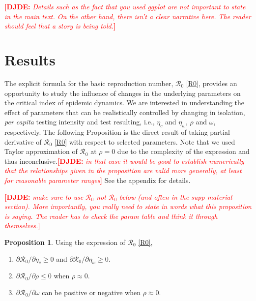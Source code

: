 \documentclass[12pt]{article}
\newcommand{\percap}{\emph{per capita}\xspace}
\newcommand{\Rnum}{\mathcal{R}_0}
\newcommand{\comment}{\showcomment}
\newcommand{\showcomment}[3]{\textcolor{#1}{\textbf{[#2: }\textsl{#3}\textbf{]}}}
\newcommand{\david}[1]{\comment{red}{DJDE}{#1}}
\theoremstyle{definition} %
\newtheorem{proposition}{Proposition}
\begin{document}
\david{Details such as the fact that you used ggplot are not important to state in the main text.  On the other hand, there isn't a clear narrative here.  The reader should feel that a story is being told.}

\section{Results}

The explicit formula for the basic reproduction number, $\Rnum$ \eqref{R0}, provides an opportunity to study the influence of changes in the underlying parameters on the critical index of epidemic dynamics. We are interested in understanding the effect of parameters that can be realistically controlled by changing in isolation, \percap testing intensity and test resulting, i.e., $\eta_c$ and $\eta_w$, $\rho$ and $\omega$, respectively. The following Proposition is the direct result of taking partial derivative of $\Rnum$ \eqref{R0} with respect to selected parameters. Note that we used Taylor approximation of $\Rnum$ at $\rho=0$ due to the complexity of the expression and thus inconclusive.\david{in that case it would be good to establish numerically that the relationships given in the proposition are valid more generally, at least for reasonable parameter ranges}
See the appendix for details.

\david{make sure to use $\Rnum$ not $\Rnum$ below (and often in the supp material section).  More importantly, you really need to state in words what this proposition is saying.  The reader has to check the param table and think it through themselves.}
\begin{proposition}
\label{prop1}
Using the expression of $\Rnum$ \eqref{R0},
\begin{enumerate}
\item \label{p1:eta}
$\partial{\Rnum}/\partial{\eta_c} \geq 0$ and $\partial{\Rnum}/\partial{\eta_w} \geq 0$. 
\item \label{p1:rho}
$\partial{\Rnum}/\partial{\rho} \leq 0$ when $\rho \approx 0$.
\item \label{p1:omega}
$\partial{\Rnum}/\partial{\omega}$ can be positive or negative when $\rho \approx 0$.
\end{enumerate}
\end{proposition}
\end{document}
